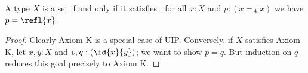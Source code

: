%
\begin{thm}\label{thm:h-set-uip-K}
 A type $X$ is a set if and only if it satisfies :
 for all $x : X$ and $p : (x =_A x)$ we have $p = \refl{x}$.
\end{thm}

\begin{proof}
  Clearly Axiom K is a special case of UIP.
  Conversely, if $X$ satisfies Axiom K, let $x, y : X$ and $p, q : (\id{x}{y})$; we want to show $p=q$.
  But induction on $q$ reduces this goal precisely to Axiom K.
\end{proof}
